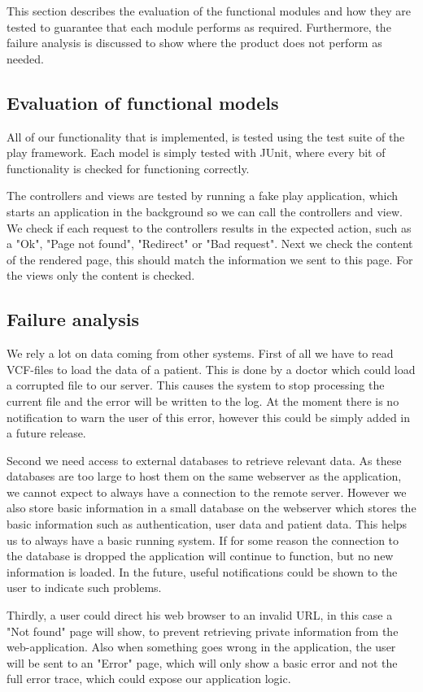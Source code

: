 This section describes the evaluation of the functional modules and how they are tested to guarantee that each module performs as required.
Furthermore, the failure analysis is discussed to show where the product does not perform as needed.

\subsection{Evaluation of functional models}
All of our functionality that is implemented, is tested using the test suite of the play framework. Each model is simply tested with JUnit, where every bit of functionality is checked for functioning correctly.

The controllers and views are tested by running a fake play application, which starts an application in the background so we can call the controllers and view. We check if each request to the controllers results in the expected action, such as a "Ok", "Page not found", "Redirect" or "Bad request". Next we check the content of the rendered page, this should match the information we sent to this page. For the views only the content is checked.
 

\subsection{Failure analysis}
We rely a lot on data coming from other systems.
First of all we have to read VCF-files to load the data of a patient. This is done by a doctor which could load a corrupted file to our server.
This causes the system to stop processing the current file and the error will be written to the log.
At the moment there is no notification to warn the user of this error, however this could be simply added in a future release.

Second we need access to external databases to retrieve relevant data.
As these databases are too large to host them on the same webserver as the application, we cannot expect to always have a connection to the remote server.
However we also store basic information in a small database on the webserver which stores the basic information such as authentication, user data and patient data.
This helps us to always have a basic running system.
If for some reason the connection to the database is dropped the application will continue to function, but no new information is loaded.
In the future, useful notifications could be shown to the user to indicate such problems.

Thirdly, a user could direct his web browser to an invalid URL, in this case a "Not found" page will show, to prevent retrieving private information from the web-application.
Also when something goes wrong in the application, the user will be sent to an "Error" page, which will only show a basic error and not the full error trace, which could expose our application logic.